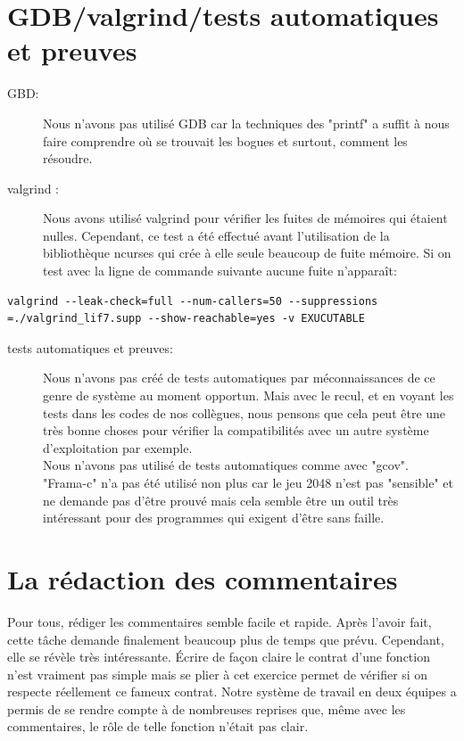 \documentclass{report}
\begin{document}
\section{GDB/valgrind/tests automatiques et preuves}
\begin{description}
\item[GBD:]
Nous n'avons pas utilisé GDB car la techniques des "printf" a suffit à nous faire comprendre où se trouvait les bogues et surtout, comment les résoudre.
\item[valgrind :]
Nous avons utilisé valgrind pour vérifier les fuites de mémoires qui étaient nulles. Cependant, ce test a été effectué avant l'utilisation de la bibliothèque ncurses qui crée à elle seule beaucoup de fuite mémoire. Si on test avec la ligne de commande suivante aucune fuite n'apparaît:
\end{description}
\begin{lstlisting}[frame=single]
valgrind --leak-check=full --num-callers=50 --suppressions
=./valgrind_lif7.supp --show-reachable=yes -v EXUCUTABLE
\end{lstlisting}
\begin{description}
\item[tests automatiques et preuves:]
Nous n'avons pas créé de tests automatiques par méconnaissances de ce genre de système au moment opportun. Mais avec le recul, et en voyant les tests dans les codes de nos collègues, nous pensons que cela peut être une très bonne choses pour vérifier la compatibilités avec un autre système d'exploitation par exemple.\\
Nous n'avons pas utilisé de tests automatiques comme avec "gcov". \\"Frama-c" n'a pas été utilisé non plus car le jeu 2048 n'est pas "sensible" et ne demande pas d'être prouvé mais cela semble être un outil très intéressant pour des programmes qui exigent d'être sans faille.
\end{description}
\section{La rédaction des commentaires}
Pour tous, rédiger les commentaires semble facile et rapide. Après l'avoir fait, cette tâche demande finalement beaucoup plus de temps que prévu. Cependant, elle se révèle très intéressante. Écrire de façon claire le contrat d'une fonction n'est vraiment pas simple mais se plier à cet exercice permet de vérifier si on respecte réellement ce fameux contrat. Notre système de travail en deux équipes a permis de se rendre compte à de nombreuses reprises que, même avec les commentaires, le rôle de telle fonction n'était pas clair.
\end{document}
